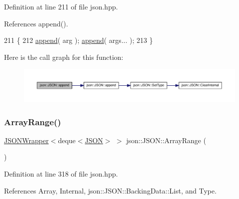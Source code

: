 Definition at line 211 of file json.\+hpp.



References append().


\begin{DoxyCode}
211                                         \{
212             \mbox{\hyperlink{classjson_1_1_j_s_o_n_aafb54a2b47ec9bbd7548a60db23fb4cf}{append}}( arg ); \mbox{\hyperlink{classjson_1_1_j_s_o_n_aafb54a2b47ec9bbd7548a60db23fb4cf}{append}}( args... );
213         \}
\end{DoxyCode}
Here is the call graph for this function\+:
\nopagebreak
\begin{figure}[H]
\begin{center}
\leavevmode
\includegraphics[width=350pt]{classjson_1_1_j_s_o_n_ac6a839771cd2c373614e9640eeef6e13_cgraph}
\end{center}
\end{figure}
\mbox{\label{classjson_1_1_j_s_o_n_ab26986d77f63734f154da3606423c098}} 
\subsubsection{\texorpdfstring{Array\+Range()}{ArrayRange()}\hspace{0.1cm}{\footnotesize\ttfamily [1/2]}}
{\footnotesize\ttfamily \mbox{\hyperlink{classjson_1_1_j_s_o_n_1_1_j_s_o_n_wrapper}{J\+S\+O\+N\+Wrapper}}$<$deque$<$\mbox{\hyperlink{classjson_1_1_j_s_o_n}{J\+S\+ON}}$>$ $>$ json\+::\+J\+S\+O\+N\+::\+Array\+Range (\begin{DoxyParamCaption}{ }\end{DoxyParamCaption})\hspace{0.3cm}{\ttfamily [inline]}}



Definition at line 318 of file json.\+hpp.



References Array, Internal, json\+::\+J\+S\+O\+N\+::\+Backing\+Data\+::\+List, and Type.


